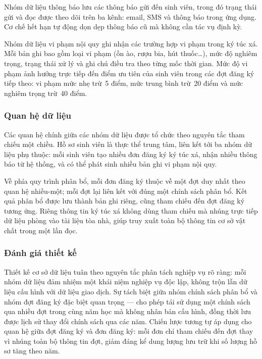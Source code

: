 \documentclass[../DoAn.tex]{subfiles}
\begin{document}
Nhóm dữ liệu thông báo lưu các thông báo gửi đến sinh viên, trong đó trạng
thái gửi và đọc được theo dõi trên ba kênh: email, SMS và thông báo trong ứng
dụng. Cơ chế hết hạn tự động dọn dẹp thông báo cũ mà không cần tác vụ định
kỳ.

Nhóm dữ liệu vi phạm nội quy ghi nhận các trường hợp vi phạm trong ký túc xá.
Mỗi bản ghi bao gồm loại vi phạm (ồn ào, rượu bia, hút thuốc\ldots), mức độ
nghiêm trọng, trạng thái xử lý và ghi chú điều tra theo từng mốc thời gian.
Mức độ vi phạm ảnh hưởng trực tiếp đến điểm ưu tiên của sinh viên trong các
đợt đăng ký tiếp theo: vi phạm mức nhẹ trừ~5 điểm, mức trung bình trừ~20 điểm
và mức nghiêm trọng trừ~40 điểm.

\subsubsection*{Quan hệ dữ liệu}

Các quan hệ chính giữa các nhóm dữ liệu được tổ chức theo nguyên tắc tham
chiếu một chiều. Hồ sơ sinh viên là thực thể trung tâm, liên kết tới ba nhóm
dữ liệu phụ thuộc: mỗi sinh viên tạo nhiều đơn đăng ký ký túc xá, nhận nhiều
thông báo từ hệ thống, và có thể phát sinh nhiều bản ghi vi phạm nội quy.

Về phía quy trình phân bổ, mỗi đơn đăng ký thuộc về một đợt duy nhất theo
quan hệ nhiều-một; mỗi đợt lại liên kết với đúng một chính sách phân bổ. Kết
quả phân bổ được lưu thành bản ghi riêng, cũng tham chiếu đến đợt đăng ký
tương ứng. Riêng thông tin ký túc xá không dùng tham chiếu mà nhúng trực tiếp
dữ liệu phòng vào tài liệu tòa nhà, giúp truy xuất toàn bộ thông tin cơ sở
vật chất trong một lần đọc.

\subsubsection*{Đánh giá thiết kế}

Thiết kế cơ sở dữ liệu tuân theo nguyên tắc phân tách nghiệp vụ rõ ràng: mỗi
nhóm dữ liệu đảm nhiệm một khái niệm nghiệp vụ độc lập, không trộn lẫn dữ liệu
cấu hình với dữ liệu giao dịch. Sự tách biệt giữa nhóm chính sách phân bổ và
nhóm đợt đăng ký đặc biệt quan trọng --- cho phép tái sử dụng một chính sách
qua nhiều đợt trong cùng năm học mà không nhân bản cấu hình, đồng thời lưu được
lịch sử thay đổi chính sách qua các năm. Chiến lược tương tự áp dụng cho quan
hệ giữa đợt đăng ký và đơn đăng ký: mỗi đơn chỉ tham chiếu đến đợt thay vì
nhúng toàn bộ thông tin đợt, giảm đáng kể dung lượng lưu trữ khi số lượng hồ
sơ tăng theo năm.
\end{document}
